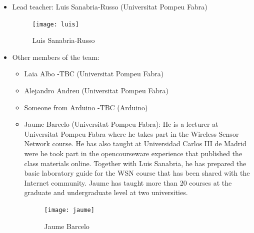 \documentclass[oneside]{book}   %
\begin{document}
\begin{itemize}
\item Lead teacher: Luis Sanabria-Russo (Universitat Pompeu Fabra)
\begin{figure}
\begin{center}
\texttt{[image: luis]}
\caption{Luis Sanabria-Russo}
\label{fig:luis}
\end{center}
\end{figure}
\item Other members of the team:
\begin{itemize}
\item Laia Albo -TBC (Universitat Pompeu Fabra)
\item Alejandro Andreu (Universitat Pompeu Fabra)
\item Someone from Arduino -TBC (Arduino)
\item Jaume Barcelo (Universitat Pompeu Fabra): He is a lecturer at Universitat Pompeu Fabra where he takes part in the Wireless Sensor Network course. He has also taught at Universidad Carlos III de Madrid were he took part in the opencourseware experience that published the class materials online. Together with Luis Sanabria, he has prepared the basic laboratory guide for the WSN course that has been shared with the Internet community. Jaume has taught more than 20 courses at the graduate and undergraduate level at two universities.
\begin{figure}
\begin{center}
\texttt{[image: jaume]}
\caption{Jaume Barcelo}
\label{fig:jaume}
\end{center}
\end{figure}


\end{itemize}
\end{itemize}
\end{document}
